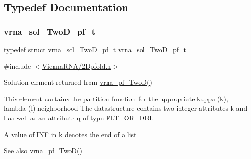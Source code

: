\subsection{Typedef Documentation}
\mbox{\label{group__kl__neighborhood__pf_ga5e449fbd695406aabd2bcabddc374621}} 
\subsubsection{\texorpdfstring{vrna\+\_\+sol\+\_\+\+Two\+D\+\_\+pf\+\_\+t}{vrna\_sol\_TwoD\_pf\_t}}
{\footnotesize\ttfamily typedef struct \hyperlink{group__kl__neighborhood__pf_structvrna__sol__TwoD__pf__t}{vrna\+\_\+sol\+\_\+\+Two\+D\+\_\+pf\+\_\+t}  \hyperlink{group__kl__neighborhood__pf_structvrna__sol__TwoD__pf__t}{vrna\+\_\+sol\+\_\+\+Two\+D\+\_\+pf\+\_\+t}}



{\ttfamily \#include $<$\hyperlink{2Dpfold_8h}{Vienna\+R\+N\+A/2\+Dpfold.\+h}$>$}



Solution element returned from \hyperlink{group__kl__neighborhood__pf_ga0bc3427689bd09da09b8b3094a27f836}{vrna\+\_\+pf\+\_\+\+Two\+D()} 

This element contains the partition function for the appropriate kappa (k), lambda (l) neighborhood The datastructure contains two integer attributes \textquotesingle{}k\textquotesingle{} and \textquotesingle{}l\textquotesingle{} as well as an attribute \textquotesingle{}q\textquotesingle{} of type \hyperlink{group__data__structures_ga31125aeace516926bf7f251f759b6126}{F\+L\+T\+\_\+\+O\+R\+\_\+\+D\+BL}

A value of \hyperlink{energy__const_8h_a12c2040f25d8e3a7b9e1c2024c618cb6}{I\+NF} in k denotes the end of a list

\begin{DoxySeeAlso}{See also}
\hyperlink{group__kl__neighborhood__pf_ga0bc3427689bd09da09b8b3094a27f836}{vrna\+\_\+pf\+\_\+\+Two\+D()} 
\end{DoxySeeAlso}


